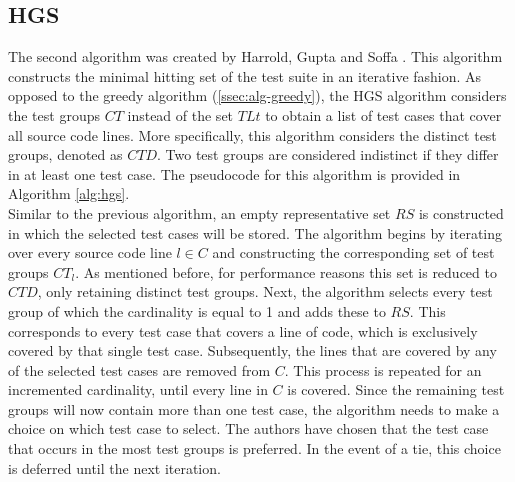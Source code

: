 
\subsection{HGS}
The second algorithm was created by Harrold, Gupta and Soffa \cite{hgs}. This algorithm constructs the minimal hitting set of the test suite in an iterative fashion. As opposed to the greedy algorithm (\autoref{ssec:alg-greedy}), the HGS algorithm considers the test groups $CT$ instead of the set $TLt$ to obtain a list of test cases that cover all source code lines. More specifically, this algorithm considers the distinct test groups, denoted as $CTD$. Two test groups are considered indistinct if they differ in at least one test case. The pseudocode for this algorithm is provided in Algorithm \autoref{alg:hgs}.\\

\noindent Similar to the previous algorithm, an empty representative set $RS$ is constructed in which the selected test cases will be stored. The algorithm begins by iterating over every source code line $l \in C$ and constructing the corresponding set of test groups $CT_l$. As mentioned before, for performance reasons this set is reduced to $CTD$, only retaining distinct test groups. Next, the algorithm selects every test group of which the cardinality is equal to 1 and adds these to $RS$. This corresponds to every test case that covers a line of code, which is exclusively covered by that single test case. Subsequently, the lines that are covered by any of the selected test cases are removed from $C$. This process is repeated for an incremented cardinality, until every line in $C$ is covered. Since the remaining test groups will now contain more than one test case, the algorithm needs to make a choice on which test case to select. The authors have chosen that the test case that occurs in the most test groups is preferred. In the event of a tie, this choice is deferred until the next iteration.\\

